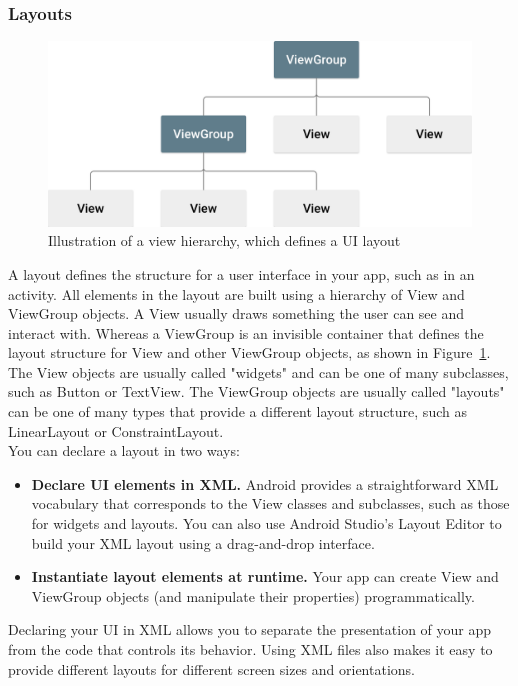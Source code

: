 \documentclass[14pt]{report}
\begin{document}
					\subsubsection{Layouts}
					\begin{figure}[b]
						\includegraphics[width=12cm]{ViewGroup.png}
						\centering
						\caption{Illustration of a view hierarchy, which defines a UI layout}
						\label{fig:View}
					\end{figure}
					A layout defines the structure for a user interface in your app, such as in an activity. All elements in the layout are built using a hierarchy of View and ViewGroup objects. A View usually draws something the user can see and interact with. Whereas a ViewGroup is an invisible container that defines the layout structure for View and other ViewGroup objects, as shown in Figure~\ref{fig:View}.\\

					The View objects are usually called "widgets" and can be one of many subclasses, such as Button or TextView. The ViewGroup objects are usually called "layouts" can be one of many types that provide a different layout structure, such as LinearLayout or ConstraintLayout.\\

					You can declare a layout in two ways:
					\begin{itemize}
						\item \textbf{Declare UI elements in XML.} Android provides a straightforward XML vocabulary that corresponds to the View classes and subclasses, such as those for widgets and layouts. You can also use Android Studio's Layout Editor to build your XML layout using a drag-and-drop interface.
						\item \textbf{Instantiate layout elements at runtime.} Your app can create View and ViewGroup objects (and manipulate their properties) programmatically.
					\end{itemize}

					Declaring your UI in XML allows you to separate the presentation of your app from the code that controls its behavior. Using XML files also makes it easy to provide different layouts for different screen sizes and orientations.\\
\end{document}
